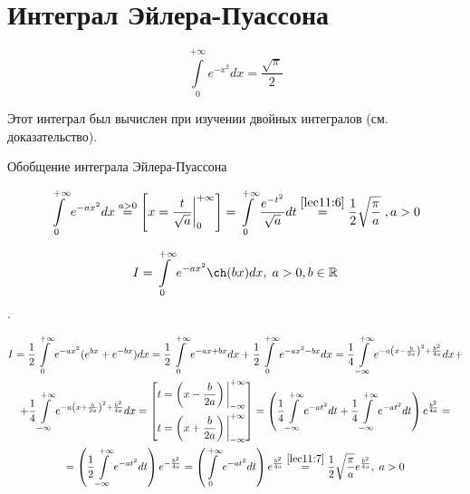 \documentclass[../../main.tex]{subfiles}
\begin{document}
	\section{Интеграл Эйлера-Пуассона}
	
	\begin{equation}\label{lec11:7}
		\int\limits_0^{+\infty} e^{-x^2} dx = \frac{\sqrt{\pi}}{2}
	\end{equation}
	
	Этот интеграл был вычислен при изучении двойных интегралов (см. доказательство). 
	
	Обобщение интеграла Эйлера-Пуассона
	
	\begin{equation}\label{lec11:8}
		\int\limits_0^{+\infty} e^{-ax^2} dx \overset{a > 0}{=} \left[ x = \frac{t}{\sqrt{a}} \bigg|_0^{+\infty} \right] = \int\limits_0^{+\infty} \frac{e^{-t^2}}{\sqrt{a}} dt \overset{\eqref{lec11:6}}{=} \frac{1}{2} \sqrt{\frac{\pi}{a}} \;, a > 0
	\end{equation}
	
	\begin{exmp}
		$$
		I = \int\limits_0^{+\infty} e^{-ax^2} \ch (bx) dx, 
		\; a > 0, b \in \R
		$$.
		
		\begin{equation*}
			\begin{gathered}
				I = \frac{1}{2} \int\limits_0^{+\infty} e^{-ax^2} (e^{bx} + e^{-bx}) dx = \frac{1}{2} \int\limits_0^{+\infty} e^{-ax + bx} dx + \frac{1}{2} \int\limits_0^{+\infty} e^{-ax^2 - bx} dx = \frac{1}{4} \int\limits_{-\infty}^{+\infty} e^{-a \left( x - \frac{b}{2a} \right)^2 + \frac{b^2}{4a}} dx + \\
				+ \frac{1}{4} \int\limits_{-\infty}^{+\infty} e^{-a \left( x + \frac{b}{2a} \right)^2 + \frac{b^2}{4a}} dx = 
				\left[ 
					\begin{gathered}
						t = \left( x - \frac{b}{2a} \right) \bigg|_{-\infty}^{+\infty} \\
						t = \left( x + \frac{b}{2a} \right) \bigg|_{-\infty}^{+\infty}
					\end{gathered}
				\right] 
				= \left( \frac{1}{4} \int\limits_{-\infty}^{+\infty} e^{-at^2} dt + \frac{1}{4} \int\limits_{-\infty}^{+\infty} e^{-at^2} dt \right) e^{\frac{b^2}{4a}} = \\
				= \left( \frac{1}{2} \int\limits_{-\infty}^{+\infty} e^{-at^2} dt \right) e^{-\frac{b^2}{4a}} = \left( \int\limits_0^{+\infty} e^{-at^2} dt \right) e^{\frac{b^2}{4a}} \overset{\eqref{lec11:7}}{=} \frac{1}{2} \sqrt{\frac{\pi}{a}} e^{\frac{b^2}{4a}}, \; a > 0
			\end{gathered}
		\end{equation*}
	\end{exmp}
\end{document}
